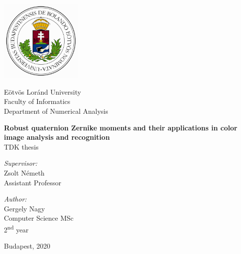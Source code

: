 \documentclass[runningheads,a4paper,11pt]{report}
\begin{document}


\begin{titlepage}
  \noindent
  \begin{minipage}{0.25 \textwidth}
    \includegraphics[height=40mm]{figures/cimer.png}
  \end{minipage}
  \hfill
  \begin{minipage}{0.67 \textwidth}
    \large
    Eötvös Loránd University \\
    Faculty of Informatics \\
    Department of Numerical Analysis \\
    
  \end{minipage}

  \vfill

  \begin{center}
    {\LARGE \bfseries Robust quaternion Zernike moments and their applications in color image analysis and recognition} 
    \\[2.0cm]
    {\Large TDK thesis}
    \\[3cm]
    \begin{minipage}[t]{0.45 \textwidth}
      \emph{Supervisor:} \\[0.25 \baselineskip]
      {\large Zsolt Németh} \\[0.5 \baselineskip]
      Assistant Professor
    \end{minipage}
    \begin{minipage}[t]{0.45 \textwidth}
      \begin{flushright}
        \emph{Author:} \\[0.25 \baselineskip]
        {\large Gergely Nagy} \\[0.5 \baselineskip]
        Computer Science MSc \\ %
        2\textsuperscript{nd} year
      \end{flushright}
    \end{minipage}
  \end{center}

  \vfill

  \begin{center}
    \large Budapest, 2020

  \end{center}
\end{titlepage}
\end{document}
